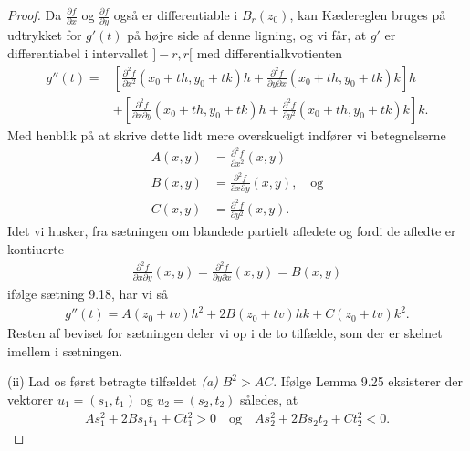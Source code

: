 \begin{proof}
  Da $\frac{\partial f}{\partial x}$ og $\frac{\partial f}{\partial y}$ også er differentiable i $B_r(z_0)$, kan Kædereglen bruges på udtrykket for $g'(t)$ på højre side af denne ligning, og vi får, at $g'$ er differentiabel i intervallet $]-r,r[$ med differentialkvotienten
  \begin{align*}
    g''(t) = &\left[ \frac{\partial^2 f}{\partial x^2}(x_0 + th, y_0 + tk)h + \frac{\partial^2 f}{\partial y \partial x}(x_0 + th, y_0 + tk)k \right] h\\
    &+ \left[ \frac{\partial^2 f}{\partial x \partial y}(x_0 + th, y_0 + tk)h + \frac{\partial^2 f}{\partial y^2}(x_0 + th, y_0 + tk) k \right] k.
  \end{align*}
  Med henblik på at skrive dette lidt mere overskueligt indfører vi betegnelserne
  \begin{align}
    A(x,y) &= \frac{\partial^2 f}{\partial x^2}(x,y)\nonumber\\
    B(x,y) &= \frac{\partial^2 f}{\partial x \partial y}(x,y), \quad \text{og} \label{9.36}\\
    C(x,y) &= \frac{\partial^2 f}{\partial y^2}(x,y).\nonumber
  \end{align}
  Idet vi husker, fra sætningen om blandede partielt afledete og fordi de afledte er kontiuerte
  \begin{align*}
    \frac{\partial^2 f}{\partial x \partial y}(x,y) = \frac{\partial^2 f}{\partial y \partial x}(x,y) = B(x,y)
  \end{align*}
  ifølge sætning 9.18, har vi så
  \begin{align}\label{9.37}
    g''(t) = A(z_0 + tv)h^2 + 2B(z_0 + tv)hk + C(z_0 + tv)k^2.
  \end{align}
  Resten af beviset for sætningen deler vi op i de to tilfælde, som der er skelnet imellem i sætningen.

  (ii) Lad os først betragte tilfældet
  \textit{(a)} $B^2 > AC$.
  Ifølge Lemma 9.25 eksisterer der vektorer $u_1 = (s_1, t_1)$ og $u_2 = (s_2, t_2)$ således, at
  \begin{align*}
    As_1^2 + 2Bs_1t_1 + Ct_1^2 > 0 \quad \text{og} \quad As_2^2 + 2Bs_2t_2 + Ct_2^2 < 0.
  \end{align*}


\end{proof}
